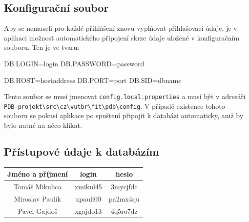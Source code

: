 \documentclass[11pt,a4paper]{article}
\begin{document}
 \subsection{Konfigurační soubor}\label{conf}
 Aby se nemuseli pro každé přihlášení znovu vyplňovat přihlašovací údaje, je v aplikaci možnost automatického připojení skrze údaje uložené v konfiguračním souboru. Ten je ve tvaru:
 \begin{center}
\begin{boxedverbatim}
DB.LOGIN=login
DB.PASSWORD=password

DB.HOST=hostaddress
DB.PORT=port
DB.SID=dbname
\end{boxedverbatim}
\end{center}
Tento soubor se musí jmenovat \texttt{config.local.properties} a musí být v adresáři \verb;PDB-projekt\src\cz\vutbr\fit\pdb\config;. V případě existence tohoto souboru se pokusí aplikace po spuštení připojit k databázi automaticky, aniž by bylo nutné na něco klikat.

\subsection{Přístupové údaje k databázím}

\begin{center}
  \begin{tabular}{ | c || c | c |}
  	\hline
  	Jméno a příjmení & login & heslo\\
    \hline\hline
    Tomáš Mikulica & xmikul45 & 3mycjfdc \\ \hline
    Miroslav Paulík & xpauli00 & pa2mx4qu \\ \hline
    Pavel Gajdoš & xgajdo13 & 4q5ro7dz \\
    \hline
  \end{tabular}
\end{center}
\end{document}
